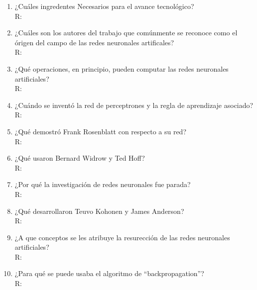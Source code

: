 \documentclass{article}
\begin{document}
\maketitle
\begin{enumerate}
	\item ¿Cuáles ingredentes Necesarios para el avance tecnológico?\\
	R: %
	\item ¿Cuáles son los autores del trabajo que comúnmente se reconoce como el órigen del campo de las redes neuronales artificales?\\
	R: %
	\item ¿Qué operaciones, en principio, pueden computar las redes neuronales artificiales?\\
	R: %
	\item ¿Cuándo se inventó la red de perceptrones y la regla de aprendizaje asociado?\\
	R: %
	\item ¿Qué demostró Frank Rosenblatt con respecto a su red?\\
	R: %
	\item ¿Qué usaron Bernard Widrow y Ted Hoff?\\
	R: %
	\item ¿Por qué la investigación de redes neuronales fue parada?\\
	R: %
	\item ¿Qué desarrollaron Teuvo Kohonen y James Anderson?\\
	R: %
	\item ¿A que conceptos se les atribuye la resurección de las redes neuronales artificiales?\\
	R: %
	\item ¿Para qué se puede usaba el algoritmo de ``backpropagation''?\\
	R: %
	
	
	
\end{enumerate}
\end{document}
